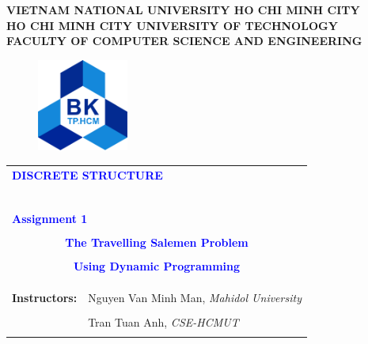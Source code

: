 \documentclass[a4paper]{article}
\begin{document}
\begin{titlepage}
\begin{center}
\textbf{\Large VIETNAM NATIONAL UNIVERSITY HO CHI MINH CITY} \\

\vspace{7pt}
\textbf{\Large HO CHI MINH CITY UNIVERSITY OF TECHNOLOGY} \\

\vspace{7pt}
\textbf{\Large FACULTY OF COMPUTER SCIENCE AND ENGINEERING}
\end{center}

\vspace{1cm}

\begin{figure}[h!]
\begin{center}
\includegraphics[width=3cm]{Images/hcmut.png}
\end{center}
\end{figure}

\vspace{1cm}


\begin{center}
\begin{tabular}{ccc}
	\multicolumn{3}{l}{\textbf{{\Large \textcolor{blue}{DISCRETE STRUCTURE}}}}\\
	~~\\
	\arrayrulecolor{blue}\hline
	\\
	\multicolumn{3}{l}{\textbf{{\Large \textcolor{blue}{Assignment 1} }}}\\
	\\
	
	\multicolumn{3}{c}{\textbf{{\Huge \textcolor{blue}{The Travelling Salemen Problem}}}}\\
	\\
    
    \multicolumn{3}{c}{\textbf{{\Huge \textcolor{blue}{Using Dynamic Programming}}}}\\
	\\
	\arrayrulecolor{blue}\hline \\ \\

    \multicolumn{1}{r}{\textbf{\Large Instructors:}} & \multicolumn{2}{l}{\Large Nguyen Van Minh Man, \textit{Mahidol University}} \\ \\
    \multicolumn{1}{r}{} & \multicolumn{2}{l}{\Large Tran Tuan Anh, \textit{CSE-HCMUT}} \\ \\


\end{tabular}
\end{center}
\end{titlepage}
\end{document}
